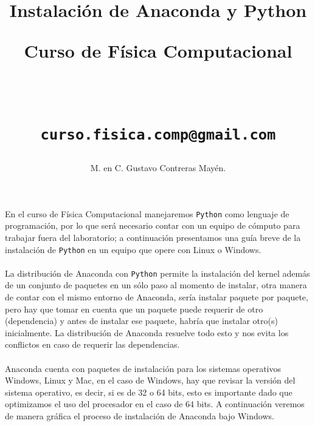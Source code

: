 \documentclass[12pt]{article}
\author{M. en C. Gustavo Contreras Mayén.}
\title{Instalación de Anaconda y Python \\ \begin{Large} Curso de Física Computacional\end{Large} \\
\begin{small}
\texttt{curso.fisica.comp@gmail.com}
\end{small}}
\date{ }
\begin{document}
\maketitle
\fontsize{14}{14}\selectfont
En el curso de Física Computacional manejaremos \texttt{Python} como lenguaje de programación, por lo que será necesario contar con un equipo de cómputo para trabajar fuera del laboratorio; a continuación presentamos una guía breve de la instalación de \texttt{Python} en un equipo que opere con Linux o Windows.
\\
\\
La distribución de Anaconda con \texttt{Python} permite la instalación del kernel además de un conjunto de paquetes en un sólo paso al momento de instalar, otra manera de contar con el mismo entorno de Anaconda, sería instalar paquete por paquete, pero hay que tomar en cuenta que un paquete puede requerir de otro (dependencia) y antes de instalar ese paquete, habría que instalar otro(s) inicialmente. La distribución de Anaconda resuelve todo esto y nos evita los conflictos en caso de requerir las dependencias.
\\
\\
Anaconda cuenta con paquetes de instalación para los sistemas operativos Windows, Linux y Mac, en el caso de Windows, hay que revisar la versión del sistema operativo, es decir, si es de 32 o 64 bits, esto es importante dado que optimizamos el uso del procesador en el caso de 64 bits. A continuación veremos de manera gráfica el proceso de instalación de Anaconda bajo Windows.
\end{document}
